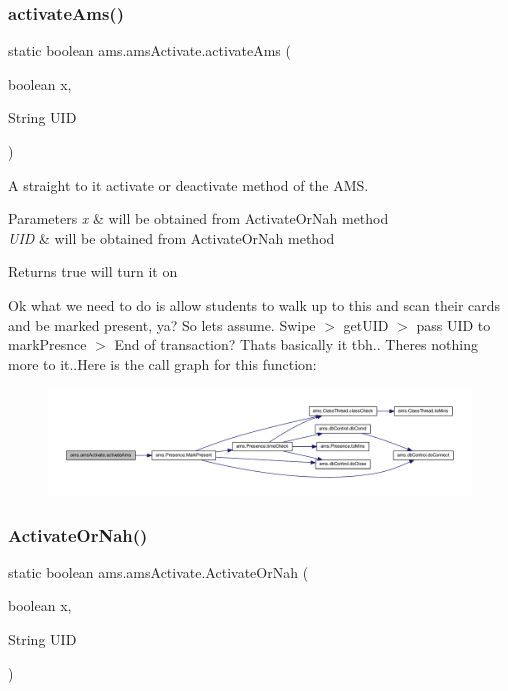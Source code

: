 \subsubsection{\texorpdfstring{activateAms()}{activateAms()}}
{\footnotesize\ttfamily static boolean ams.\+ams\+Activate.\+activate\+Ams (\begin{DoxyParamCaption}\item[{boolean}]{x,  }\item[{String}]{U\+ID }\end{DoxyParamCaption})\hspace{0.3cm}{\ttfamily [static]}}

A straight to it activate or deactivate method of the A\+MS. 
\begin{DoxyParams}{Parameters}
{\em x} & will be obtained from Activate\+Or\+Nah method \\
\hline
{\em U\+ID} & will be obtained from Activate\+Or\+Nah method \\
\hline
\end{DoxyParams}
\begin{DoxyReturn}{Returns}
true will turn it on 
\end{DoxyReturn}
Ok what we need to do is allow students to walk up to this and scan their cards and be marked present, ya? So let\textquotesingle{}s assume. Swipe $>$ get\+U\+ID $>$ pass U\+ID to mark\+Presnce $>$ End of transaction? That\textquotesingle{}s basically it tbh.. There\textquotesingle{}s nothing more to it..Here is the call graph for this function\+:\nopagebreak
\begin{figure}[H]
\begin{center}
\leavevmode
\includegraphics[width=350pt]{classams_1_1ams_activate_a103584e81b703fa2552d353d14366057_cgraph}
\end{center}
\end{figure}
\mbox{\label{classams_1_1ams_activate_a01ac1b9a3cd5d20b61b46496a7ff3a95}} 
\subsubsection{\texorpdfstring{ActivateOrNah()}{ActivateOrNah()}}
{\footnotesize\ttfamily static boolean ams.\+ams\+Activate.\+Activate\+Or\+Nah (\begin{DoxyParamCaption}\item[{boolean}]{x,  }\item[{String}]{U\+ID }\end{DoxyParamCaption})\hspace{0.3cm}{\ttfamily [static]}}

